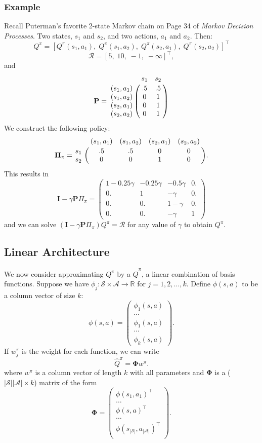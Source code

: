 \documentclass{article}
\newcommand{\bra}[1]{\left[#1\right]}
\newcommand{\abs}[1]{\left|#1\right|}
\newcommand{\R}{\mathbb{R}}
\begin{document}
\subsubsection*{Example} %
\label{ssub:example}
Recall Puterman's favorite 2-state Markov chain on Page 34 of \emph{Markov Decision Processes}. Two states, $s_{1}$ and $s_{2}$, and two actions, $a_{1}$ and $a_{2}$. Then:
\[
	Q^{\pi}=\bra{
		Q^{\pi}(s_{1},a_{1}),\; 
		Q^{\pi}(s_{1},a_{2}),\; 
		Q^{\pi}(s_{2},a_{1}),\; 
		Q^{\pi}(s_{2},a_{2})}^\intercal
\]
\[
	\mathcal{R}=\bra{
		5,\; 
		10,\; 
		-1,\; 
		-\infty}^\intercal,
\]and
\[
	\mathbf{P}=\bordermatrix{
		& s_{1} & s_{2} \cr
		(s_{1},a_{1}) &.5&.5   \cr
		(s_{1},a_{2}) &0&1   \cr
		(s_{2},a_{1}) &0&1   \cr
		(s_{2},a_{2}) &0&1
	}
\]
We construct the following policy:
\[
	\mathbf{\Pi}_{\pi}=\bordermatrix{
	& (s_{1},a_{1}) & (s_{1},a_{2}) & (s_{2},a_{1}) & (s_{2},a_{2}) \cr
	s_{1} &.5&.5&0&0\cr
	s_{2} &0&0&1&0\cr
	}.
\]
This results in 
\[
	\mathbf{I}-\gamma \mathbf{P}\Pi_{\pi}=\left(
	\begin{matrix}
	 1-0.25 \gamma  & -0.25 \gamma  & -0.5 \gamma  & 0. \\
	 0. & 1 & -\gamma  & 0. \\
	 0. & 0. & 1- \gamma  & 0. \\
	 0. & 0. & -\gamma  & 1
	\end{matrix}
	\right)
\]
and we can solve $(\mathbf{I}-\gamma \mathbf{P}\Pi_{\pi})Q^{\pi}=\mathcal{R}$  for any value of $\gamma$ to obtain $Q^{\pi}$. 

\subsection*{Linear Architecture} %
\label{sec:linear_architecture}
We now consider approximating $Q^{\pi}$ by a $\hat{Q}^{\pi}$, a linear combination of basis functions.
Suppose we have $\phi_{j}:\mathcal{S}\times\mathcal{A}\rightarrow \R$ for $j=1,2,\ldots,k$. 
Define $\phi(s,a)$ to be a column vector of size $k$:
\[
	\phi(s,a)=\left(\begin{smallmatrix}
		\phi_{1}(s,a) \\ \cdots \\ \phi_{1}(s,a) \\ \cdots \\ \phi_{k}(s,a)
	\end{smallmatrix}\right).
\]
If $w_{j}^{\pi}$ is the weight for each function, we can write 
\[
	\hat{Q}^{\pi}=\mathbf{\Phi}w^{\pi}.
\]
where $w^{\pi}$ is a column vector of length $k$ with all parameters and $\mathbf{\Phi}$ is a ($\abs{\mathcal{S}}\abs{\mathcal{A}}\times k$) matrix of the form
\[
	\mathbf{\Phi}=\begin{pmatrix}
		\phi(s_{1},a_{1})^\intercal\\
		\ldots\\
		\phi(s,a)^\intercal\\
		\ldots\\
		\phi(s_{\abs{\mathcal{S}}},a_{\abs{\mathcal{A}}})^\intercal\\
	\end{pmatrix}.
\]
\end{document}

